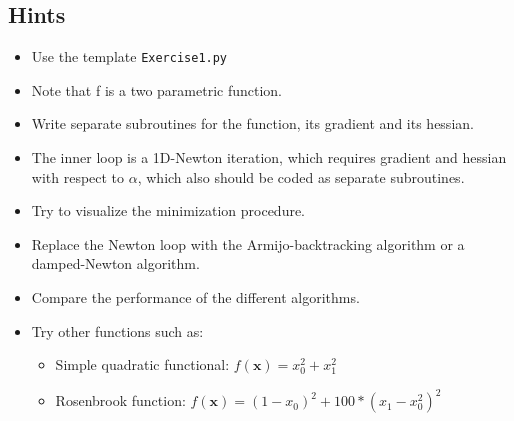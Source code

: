 \documentclass[11pt,a4paper]{article}
\begin{document}
\subsection*{Hints}
\begin{itemize}
\item{Use the template \tt{Exercise1.py}}
\item{Note that f is a two parametric function.}
\item{Write separate subroutines for the function, its gradient and its hessian.}
\item{The inner loop is a 1D-Newton iteration, which requires gradient and hessian with respect to $\alpha$, which also should be coded as separate subroutines.}
\item{Try to visualize the minimization procedure.}
\item{Replace the Newton loop with the Armijo-backtracking algorithm or a damped-Newton algorithm.}
\item{Compare the performance of the different algorithms.}
\item{Try other functions such as:}
 \begin{itemize}
  \item{Simple quadratic functional: $f(\mathbf{x})=x_0^2+x_1^2$}
  \item{Rosenbrook function: $f(\mathbf{x})=(1-x_0)^2 + 100*(x_1-x_0^2)^2$}
 \end{itemize}
\end{itemize}
\end{document}
